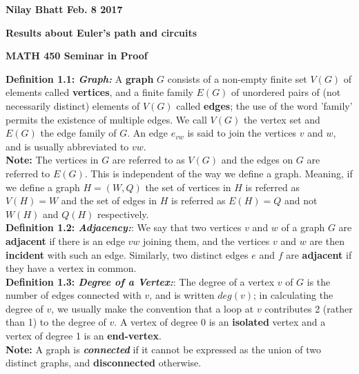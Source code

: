 \documentclass[12pt, fullpage]{article}
\begin{document}
\begin{flushleft}
\textbf{Nilay Bhatt Feb. 8 2017}		
\end{flushleft}
\begin{center}
	\textbf{Results about Euler's path and circuits}
\end{center}
\begin{center}
		
{\bf MATH 450 Seminar in Proof}
 \\
\end{center}
\textbf{Definition 1.1: \textit{Graph: }}A \textbf{graph} $G$ consists of a non-empty finite set $V(G)$ of elements called \textbf{vertices},
and a finite family $E(G)$ of unordered pairs of (not necessarily distinct) elements
of $V(G)$ called \textbf{edges}; the use of the word 'family' permits the existence of multiple edges. We call $V(G)$ the vertex set and $E(G)$ the edge family of $G$. An edge $e_{vw}$ is said to join the vertices $v$ and $w$, and is usually abbreviated to $vw$. \\

\textbf{Note:}	The vertices in $G$ are referred to as $V(G)$ and the edges on $G$ are referred to $E(G)$. This is independent of the way we define a graph. Meaning, if we define a graph $H = (W,Q)$ the set of vertices in $H$ is referred as $V(H) = W$ and the set of edges in $H$ is referred as $E(H) = Q$ and not $W(H)$ and  $Q(H)$ respectively.\\

\textbf{Definition 1.2: \textit{Adjacency:}}: We say that two vertices $v$ and $w$ of a graph $G$ are \textbf{adjacent} if there is an edge $vw$ joining
them, and the vertices $v$ and $w$ are then \textbf{incident} with such an edge. Similarly, two
distinct edges $e$ and $f$ are \textbf{adjacent} if they have a vertex in common.\\

\textbf{Definition 1.3: \textit{Degree of a Vertex:}}: The degree of a vertex $v$ of $G$ is the number of edges connected with $v$, and is written
$deg(v)$; in calculating the degree of $v$, we usually make the convention that a loop at $v$
contributes 2 (rather than 1) to the degree of $v$. A vertex of degree 0 is an \textbf{isolated} vertex and a vertex of degree 1 is an \textbf{end-vertex}.\\

\textbf{Note:} A graph is \textit{\textbf{connected}} if it cannot be expressed as the union of two distinct graphs, and \textbf{disconnected} otherwise. \\
\end{document}
